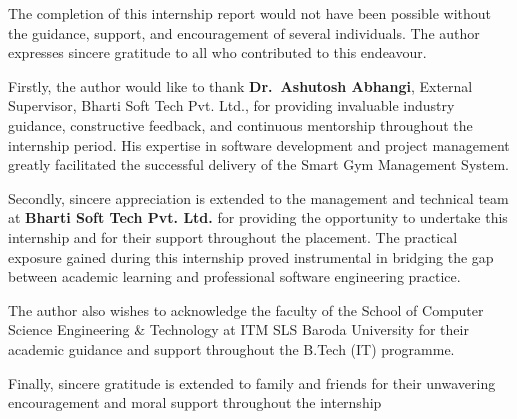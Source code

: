 \documentclass[
  12pt,
  a4paperpaper,
]{report}
\begin{document}
\vspace*{\fill}

\vspace*{\fill}
\label{acknowledgements}
\vspace{12pt}


\vspace{0.1in}

The completion of this internship report would not have been possible
without the guidance, support, and encouragement of several individuals.
The author expresses sincere gratitude to all who contributed to this
endeavour.

\medskip

Firstly, the author would like to thank \textbf{Dr.~Ashutosh Abhangi},
External Supervisor, Bharti Soft Tech Pvt. Ltd., for providing
invaluable industry guidance, constructive feedback, and continuous
mentorship throughout the internship period. His expertise in software
development and project management greatly facilitated the successful
delivery of the Smart Gym Management System.

\medskip

Secondly, sincere appreciation is extended to the management and
technical team at \textbf{Bharti Soft Tech Pvt. Ltd.} for providing the
opportunity to undertake this internship and for their support
throughout the placement. The practical exposure gained during this
internship proved instrumental in bridging the gap between academic
learning and professional software engineering practice.

\medskip

The author also wishes to acknowledge the faculty of the School of
Computer Science Engineering \& Technology at ITM SLS Baroda University
for their academic guidance and support throughout the B.Tech (IT)
programme.

\medskip

Finally, sincere gratitude is extended to family and friends for their
unwavering encouragement and moral support throughout the internship
\vspace*{\fill}

\vspace*{\fill}

\label{abstract}
\vspace{12pt}
\end{document}
